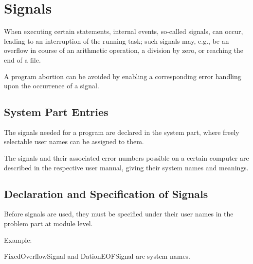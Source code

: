 \chapter{Signals}   %
\label{sec_signals}

When executing certain statements, internal events, so-called signals,
can occur, leading to an interruption of the running task; such signals
may, e.g., be an overflow in course of an arithmetic operation, a
division by zero, or reaching the end of a file.

A program abortion can be avoided by enabling a corresponding error
handling upon the occurrence of a signal.

\section{System Part Entries}
The signals needed for a program are declared in the system part, where
freely selectable user names can be assigned to them.




The signals and their associated error numbers possible on a certain
computer are described in the respective user manual, giving their
system names and meanings.

\section{Declaration and Specification of Signals} 

Before signals are used, they must be specified under their user names
in the problem part at module level.

Example:

FixedOverflowSignal and DationEOFSignal are system names.

